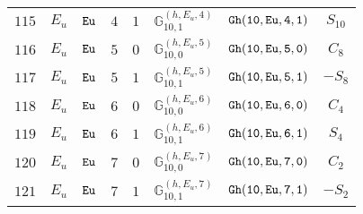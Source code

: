 \documentclass[fleqn,8pt]{jsarticle}
\begin{document}
\begin{table}[ht!]
\begin{center}
\begin{tabular}{cccccccc}
$ 115 $ & $ E_{u} $ & $ {\tt Eu} $ & $ 4 $ & $ 1 $ & $ \mathbb{G}_{10,1}^{(h,E_{u},4)} $ & $ {\tt Gh(10,Eu,4,1)} $ & $ S_{10} $ \\
$ 116 $ & $ E_{u} $ & $ {\tt Eu} $ & $ 5 $ & $ 0 $ & $ \mathbb{G}_{10,0}^{(h,E_{u},5)} $ & $ {\tt Gh(10,Eu,5,0)} $ & $ C_{8} $ \\
$ 117 $ & $ E_{u} $ & $ {\tt Eu} $ & $ 5 $ & $ 1 $ & $ \mathbb{G}_{10,1}^{(h,E_{u},5)} $ & $ {\tt Gh(10,Eu,5,1)} $ & $ - S_{8} $ \\
$ 118 $ & $ E_{u} $ & $ {\tt Eu} $ & $ 6 $ & $ 0 $ & $ \mathbb{G}_{10,0}^{(h,E_{u},6)} $ & $ {\tt Gh(10,Eu,6,0)} $ & $ C_{4} $ \\
$ 119 $ & $ E_{u} $ & $ {\tt Eu} $ & $ 6 $ & $ 1 $ & $ \mathbb{G}_{10,1}^{(h,E_{u},6)} $ & $ {\tt Gh(10,Eu,6,1)} $ & $ S_{4} $ \\
$ 120 $ & $ E_{u} $ & $ {\tt Eu} $ & $ 7 $ & $ 0 $ & $ \mathbb{G}_{10,0}^{(h,E_{u},7)} $ & $ {\tt Gh(10,Eu,7,0)} $ & $ C_{2} $ \\
$ 121 $ & $ E_{u} $ & $ {\tt Eu} $ & $ 7 $ & $ 1 $ & $ \mathbb{G}_{10,1}^{(h,E_{u},7)} $ & $ {\tt Gh(10,Eu,7,1)} $ & $ - S_{2} $ \\
 \hline \hline
\end{tabular}
\end{center}
\end{table}
\end{document}
